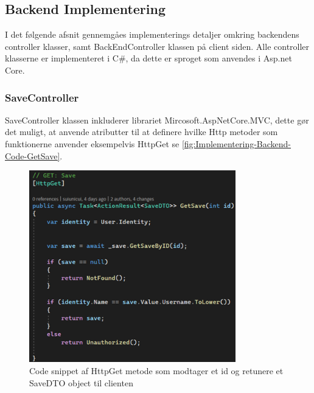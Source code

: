 \subsection{Backend Implementering}

I det følgende afsnit gennemgåes implementerings detaljer omkring backendens controller klasser, samt BackEndController klassen på client siden. Alle controller klasserne er implementeret i C\#, da dette er sproget som anvendes i Asp.net Core. \\

\subsubsection{SaveController}
SaveController klassen inkluderer librariet Mircosoft.AspNetCore.MVC, dette gør det muligt, at anvende atributter til at definere hvilke Http metoder som funktionerne anvender eksempelvis HttpGet se \autoref{fig:Implementering-Backend-Code-GetSave}.

\begin{figure}[H]
\centering
\includegraphics[width = 0.8\textwidth]{02-Body/Images/Backend_Code_GetSave.PNG}
\caption{Code snippet af HttpGet metode som modtager et id og retunere et SaveDTO object til clienten}
\label{fig:Implementering-Backend-Code-GetSave}
\end{figure}

